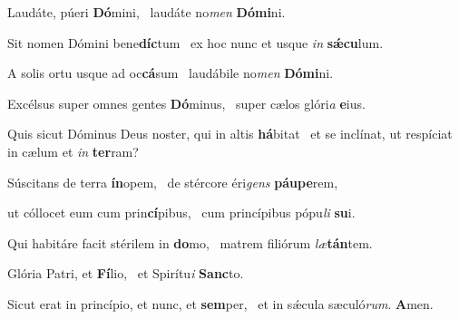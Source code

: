 \item Laudáte, púeri \textbf{Dó}mini,~\psstar{} laudáte no\textit{men} \textbf{Dómi}ni.

\item Sit nomen Dómini bene\textbf{díc}tum~\psstar{} ex hoc nunc et usque \textit{in} \textbf{sǽcu}lum.

\item A solis ortu usque ad oc\textbf{cá}sum~\psstar{} laudábile no\textit{men} \textbf{Dómi}ni.

\item Excélsus super omnes gentes \textbf{Dó}minus,~\psstar{} super cælos glóri\textit{a} \textbf{e}ius.

\item Quis sicut Dóminus Deus noster, qui in altis \textbf{há}bitat~\psstar{} et se inclínat, ut respíciat in cælum et \textit{in} \textbf{ter}ram?

\item Súscitans de terra \textbf{ín}opem,~\psstar{} de stércore éri\textit{gens} \textbf{páupe}rem,

\item ut cóllocet eum cum prin\textbf{cí}pibus,~\psstar{} cum princípibus pópu\textit{li} \textbf{su}i.

\item Qui habitáre facit stérilem in \textbf{do}mo,~\psstar{} matrem filiórum \textit{læ}\textbf{tán}tem.

\item Glória Patri, et \textbf{Fí}lio,~\psstar{} et Spirítu\textit{i} \textbf{Sanc}to.

\item Sicut erat in princípio, et nunc, et \textbf{sem}per,~\psstar{} et in sǽcula sæculó\textit{rum}. \textbf{A}men.
